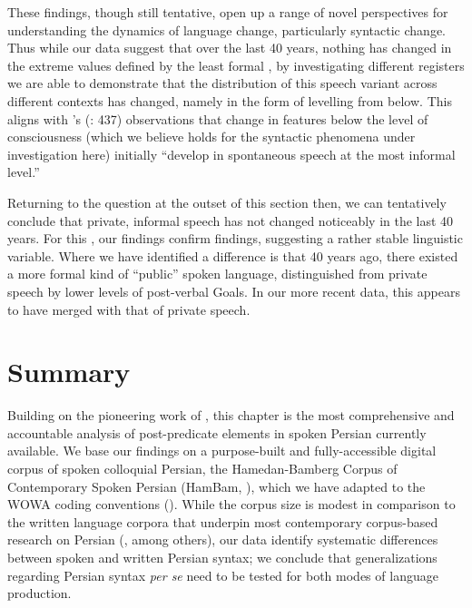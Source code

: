 \documentclass[output=paper,colorlinks,citecolor=brown,draftmode]{langscibook}
\begin{document}
These findings, though still tentative, open up a range of novel perspectives for understanding the dynamics of language change, particularly syntactic change. Thus while our data suggest that over the last 40 years, nothing has changed in the extreme values defined by the least formal , by investigating different registers we are able to demonstrate that the distribution of this speech variant across different contexts has changed, namely in the form of levelling from below. This aligns with \citeauthor{labov2001principles}'s (\citeyear{labov2001principles}: 437) observations that change in features below the level of consciousness (which we believe holds for the syntactic phenomena under investigation here) initially ``develop in spontaneous speech at the most informal level.'' 

Returning to the question at the outset of this section then, we can tentatively conclude that private, informal speech has not changed noticeably in the last 40 years. For this , our findings confirm  findings, suggesting a rather stable linguistic variable. Where we have identified a difference is that 40 years ago, there existed a more formal kind of ``public'' spoken language, distinguished from private speech by lower levels of post-verbal Goals. In our more recent data, this  appears to have merged with that of private speech. 


\section{Summary}\label{Persian:6}

Building on the pioneering work of \citet{frommer_post-verbal_1981}, this chapter is the most comprehensive and accountable analysis of post-predicate elements in spoken Persian currently available. We base our findings on a purpose-built and fully-accessible digital corpus of spoken colloquial Persian, the Hamedan-Bamberg Corpus of Contemporary Spoken Persian (HamBam, \citealt{HaigRasekhMahand2022HamBam}), which we have adapted to the WOWA coding conventions (\citealt{Izadi2022Persian}). While the corpus size is modest in comparison to the written language corpora that underpin most contemporary corpus-based research on Persian (\citealt{Faghirietal2018Canonical,FaghiriSamvelian2020SOV}, among others), our data identify systematic differences between spoken and written Persian syntax; we conclude that generalizations regarding Persian syntax \textit{per se} need to be tested for both modes of language production. 
\end{document}
